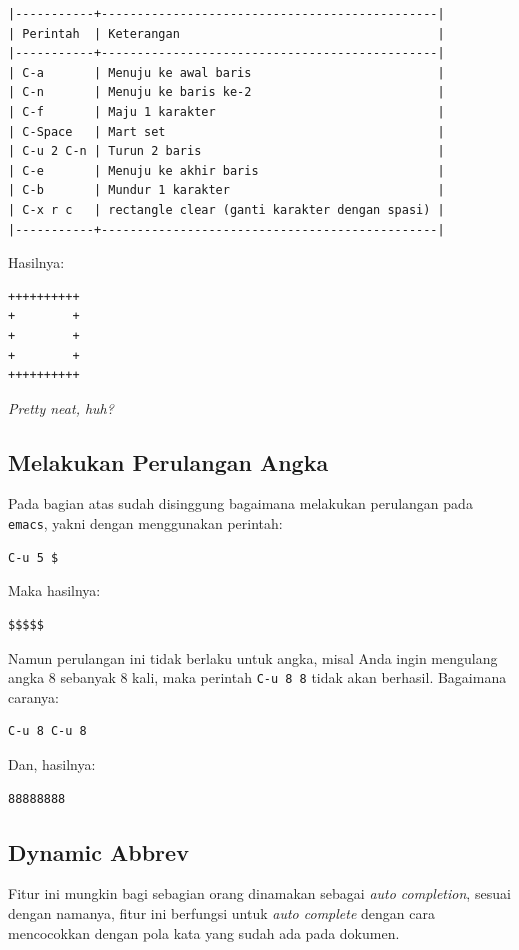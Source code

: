 \documentclass{article}
\begin{document}
\begin{verbatim}
|-----------+-----------------------------------------------|
| Perintah  | Keterangan                                    |
|-----------+-----------------------------------------------|
| C-a       | Menuju ke awal baris                          |
| C-n       | Menuju ke baris ke-2                          |
| C-f       | Maju 1 karakter                               |
| C-Space   | Mart set                                      |
| C-u 2 C-n | Turun 2 baris                                 |
| C-e       | Menuju ke akhir baris                         |
| C-b       | Mundur 1 karakter                             |
| C-x r c   | rectangle clear (ganti karakter dengan spasi) |
|-----------+-----------------------------------------------|
\end{verbatim}

Hasilnya:

\begin{verbatim}
++++++++++
+        +
+        +
+        +
++++++++++
\end{verbatim}

\emph{Pretty neat, huh?}

\subsection{Melakukan Perulangan Angka}
Pada bagian atas sudah disinggung bagaimana melakukan perulangan pada 
\verb=emacs=, yakni dengan menggunakan perintah:

\begin{verbatim}
C-u 5 $
\end{verbatim}

Maka hasilnya:

\begin{verbatim}
$$$$$
\end{verbatim}

Namun perulangan ini tidak berlaku untuk angka, misal Anda ingin mengulang
angka 8 sebanyak 8 kali, maka perintah \verb=C-u 8 8= tidak akan berhasil.
Bagaimana caranya:

\begin{verbatim}
C-u 8 C-u 8
\end{verbatim}

Dan, hasilnya:

\begin{verbatim}
88888888
\end{verbatim}

\subsection{Dynamic Abbrev}
Fitur ini mungkin bagi sebagian orang dinamakan sebagai \emph{auto completion},
sesuai dengan namanya, fitur ini berfungsi untuk \emph{auto complete} dengan 
cara mencocokkan dengan pola kata yang sudah ada pada dokumen.
\end{document}
